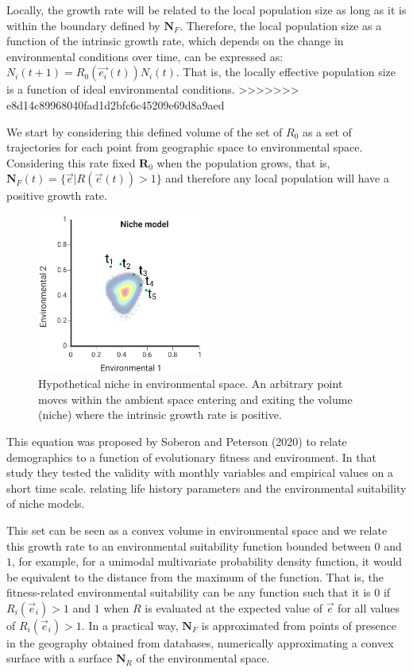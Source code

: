 \documentclass[
]{article}
\begin{document}
Locally, the growth rate will be related to the local population
size as long as it is within the boundary defined by \(\mathbf{N}_F\).
Therefore, the local population size as a function of the intrinsic growth rate, which depends on the change in environmental conditions over time, can be expressed as:
\(N_i(t+1) = R_0(\vec{e_i}(t) ) N_i(t)\). That is, the locally effective
population size is a function of ideal environmental conditions.
>>>>>>> e8d14c89968040fad1d2bfc6c45209e69d8a9aed

We start by considering this defined volume of the set of \(R_0\) as a
set of trajectories for each point from geographic space to
environmental space. Considering this rate fixed \(\mathbf{R}_0\) when
the population grows, that is,
\(\mathbf{N}_F(t) = \{\vec{e} | R(\vec{e}(t)) > 1 \}\) and therefore any
local population will have a positive growth rate.

\begin{figure}
\centering
\includegraphics[width=0.5\textwidth,height=\textheight]{all_figures/figure_1.png}
\caption{Hypothetical niche in environmental space. An arbitrary point
moves within the ambient space entering and exiting the volume (niche)
where the intrinsic growth rate is positive.}
\end{figure}

This equation was proposed by Soberon and Peterson (2020) to relate
demographics to a function of evolutionary fitness and environment. In
that study they tested the validity with monthly variables and empirical
values on a short time scale. relating life history parameters and the
environmental suitability of niche models.

This set can be seen as a convex volume in environmental space and we
relate this growth rate to an environmental suitability function bounded
between \(0\) and \(1\), for example, for a unimodal multivariate
probability density function, it would be equivalent to the distance
from the maximum of the function. That is, the fitness-related
environmental suitability can be any function such that it is \(0\) if
\(R_i(\vec{e}_i) > 1\) and \(1\) when \(R\) is evaluated at the expected
value of \(\vec {e}\) for all values of \(R_i(\vec{e}_i) > 1\). In a
practical way, \(\mathbf{N}_F\) is approximated from points of presence
in the geography obtained from databases, numerically approximating a
convex surface with a surface \(\mathbf{N}_R\) of the environmental
space.
\end{document}
